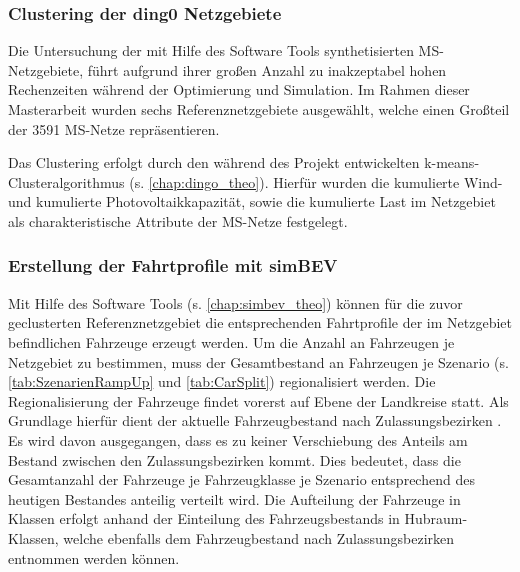 \subsubsection{Clustering der ding0 Netzgebiete}


Die Untersuchung der mit Hilfe des Software Tools \dingo synthetisierten \gls{MS}-Netzgebiete, führt aufgrund ihrer großen Anzahl zu inakzeptabel hohen Rechenzeiten während der Optimierung und Simulation.
Im Rahmen dieser Masterarbeit wurden sechs Referenznetzgebiete ausgewählt, welche einen Großteil der \num{3591} \gls{MS}-Netze repräsentieren.\medskip

Das Clustering erfolgt durch den während des \openego Projekt entwickelten k-means-Clusteralgorithmus (s. \autoref{chap:dingo_theo}).
Hierfür wurden die kumulierte Wind- und kumulierte Photovoltaikkapazität, sowie die kumulierte Last im Netzgebiet als charakteristische Attribute der \gls{MS}-Netze festgelegt.


\subsubsection{Erstellung der Fahrtprofile mit simBEV}

Mit Hilfe des Software Tools \simbev (s. \autoref{chap:simbev_theo}) können für die zuvor geclusterten Referenznetzgebiet die entsprechenden Fahrtprofile der im Netzgebiet befindlichen Fahrzeuge erzeugt werden.
Um die Anzahl an Fahrzeugen je Netzgebiet zu bestimmen, muss der Gesamtbestand an Fahrzeugen je Szenario (s. \autoref{tab:SzenarienRampUp} und \autoref{tab:CarSplit}) regionalisiert werden.
Die Regionalisierung der Fahrzeuge findet vorerst auf Ebene der Landkreise statt.
Als Grundlage hierfür dient der aktuelle Fahrzeugbestand nach Zulassungsbezirken \cite[][Stand: ]{KBAPLZ2020}.
Es wird davon ausgegangen, dass es zu keiner Verschiebung des Anteils am Bestand zwischen den Zulassungsbezirken kommt.
Dies bedeutet, dass die Gesamtanzahl der Fahrzeuge je Fahrzeugklasse je Szenario entsprechend des heutigen Bestandes anteilig verteilt wird.
Die Aufteilung der Fahrzeuge in Klassen erfolgt anhand der Einteilung des Fahrzeugsbestands in Hubraum-Klassen, welche ebenfalls dem Fahrzeugbestand nach Zulassungsbezirken entnommen werden können.\medskip

